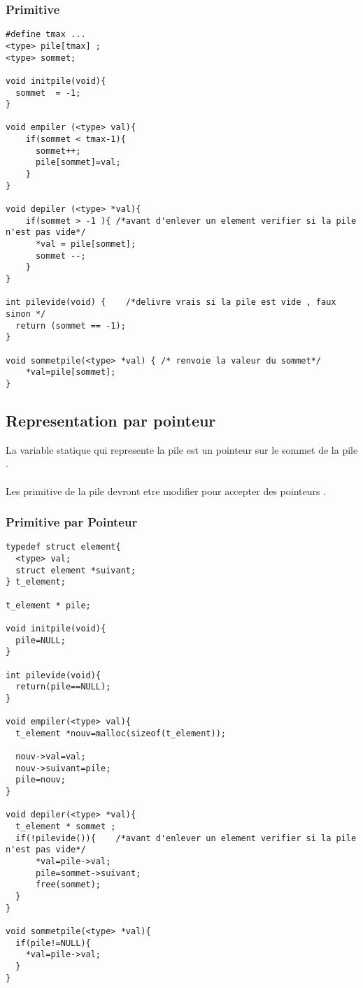 \subsubsection{Primitive}

\begin{verbatim}
#define tmax ...
<type> pile[tmax] ;
<type> sommet;

void initpile(void){
  sommet  = -1;
}

void empiler (<type> val){
    if(sommet < tmax-1){
      sommet++;
      pile[sommet]=val;
    }
}

void depiler (<type> *val){
    if(sommet > -1 ){ /*avant d'enlever un element verifier si la pile n'est pas vide*/
      *val = pile[sommet];
      sommet --;
    }
} 

int pilevide(void) {    /*delivre vrais si la pile est vide , faux sinon */
  return (sommet == -1);
}

void sommetpile(<type> *val) { /* renvoie la valeur du sommet*/
    *val=pile[sommet];
}
\end{verbatim}

\subsection{Representation par pointeur}

La variable statique qui represente la pile est un pointeur sur le sommet de la pile .\\
\\
Les primitive de la pile devront etre modifier pour accepter des pointeurs .\\

\subsubsection{Primitive par Pointeur}
\begin{verbatim}
typedef struct element{
  <type> val;
  struct element *suivant;
} t_element;

t_element * pile;

void initpile(void){
  pile=NULL;
}

int pilevide(void){
  return(pile==NULL);
}

void empiler(<type> val){
  t_element *nouv=malloc(sizeof(t_element));

  nouv->val=val;
  nouv->suivant=pile;
  pile=nouv;
}

void depiler(<type> *val){
  t_element * sommet ;
  if(!pilevide()){    /*avant d'enlever un element verifier si la pile n'est pas vide*/
      *val=pile->val;  
      pile=sommet->suivant;
      free(sommet);
  }
}

void sommetpile(<type> *val){
  if(pile!=NULL){
    *val=pile->val;
  }
}
\end{verbatim}


